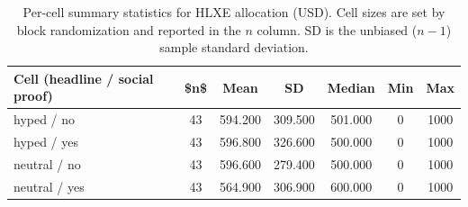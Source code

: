 \begin{table}[!htbp]
  \centering
  \begin{threeparttable}
  \caption{Per-cell summary statistics for HLXE allocation (USD). Cell sizes are set by block randomization and reported in the $n$ column. SD is the unbiased ($n{-}1$) sample standard deviation.}
  \label{tab:summary_cell}
  \begin{tabular}{lcccccc}
\toprule
Cell (headline / social proof) & \$n\$ & Mean & SD & Median & Min & Max \\
\midrule
hyped / no & 43 & 594.200 & 309.500 & 501.000 & 0 & 1000 \\
hyped / yes & 43 & 596.800 & 326.600 & 500.000 & 0 & 1000 \\
neutral / no & 43 & 596.600 & 279.400 & 500.000 & 0 & 1000 \\
neutral / yes & 43 & 564.900 & 306.900 & 600.000 & 0 & 1000 \\
\bottomrule
\end{tabular}
  \end{threeparttable}
\end{table}
